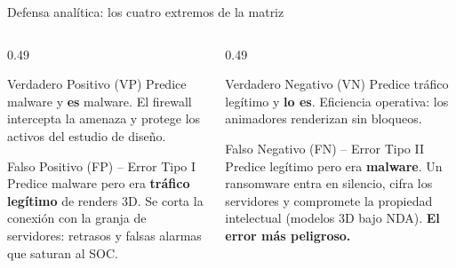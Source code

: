 \documentclass[10pt,aspectratio=169]{beamer}
\begin{document}
\begin{frame}{Defensa analítica: los cuatro extremos de la matriz}
  \small
  \begin{columns}[T]
    \begin{column}{0.49\textwidth}
      \begin{exampleblock}{Verdadero Positivo (VP)}
        Predice malware y \textbf{es} malware. El firewall intercepta la amenaza y protege los activos del estudio de diseño.
      \end{exampleblock}
      \begin{block}{Falso Positivo (FP) -- Error Tipo I}
        Predice malware pero era \textbf{tráfico legítimo} de renders 3D. Se corta la conexión con la granja de servidores: retrasos y falsas alarmas que saturan al SOC.
      \end{block}
    \end{column}
    \begin{column}{0.49\textwidth}
      \begin{exampleblock}{Verdadero Negativo (VN)}
        Predice tráfico legítimo y \textbf{lo es}. Eficiencia operativa: los animadores renderizan sin bloqueos.
      \end{exampleblock}
      \begin{alertblock}{Falso Negativo (FN) -- Error Tipo II}
        Predice legítimo pero era \textbf{malware}. Un ransomware entra en silencio, cifra los servidores y compromete la propiedad intelectual (modelos 3D bajo NDA). \textbf{El error más peligroso.}
      \end{alertblock}
    \end{column}
  \end{columns}
\end{frame}
\end{document}
